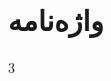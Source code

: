 \documentclass[11pt]{article}
\begin{document}
\newpage %

\linespread{1}
\small
\setlength{\parskip}{0pt}
\setlength{\parsep}{0pt}


\newpage %

\section*{واژه‌نامه}
\begin{persian}
\begin{LTR}
\begin{multicols}{3}
\theendnotes
\end{multicols}
\end{LTR}
\end{persian}
\end{document}
